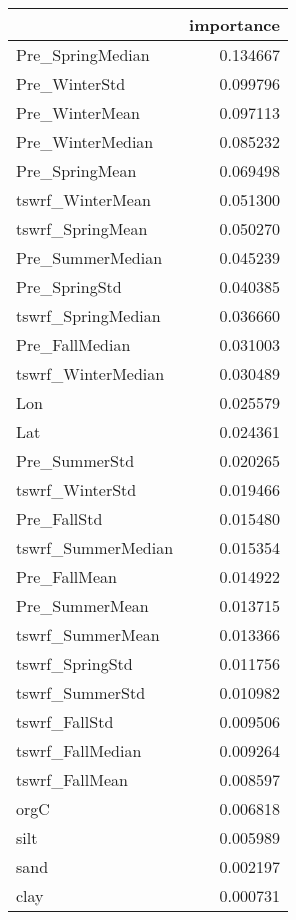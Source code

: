 \begin{tabular}{lr}
\toprule
 & importance \\
\midrule
Pre_SpringMedian & 0.134667 \\
Pre_WinterStd & 0.099796 \\
Pre_WinterMean & 0.097113 \\
Pre_WinterMedian & 0.085232 \\
Pre_SpringMean & 0.069498 \\
tswrf_WinterMean & 0.051300 \\
tswrf_SpringMean & 0.050270 \\
Pre_SummerMedian & 0.045239 \\
Pre_SpringStd & 0.040385 \\
tswrf_SpringMedian & 0.036660 \\
Pre_FallMedian & 0.031003 \\
tswrf_WinterMedian & 0.030489 \\
Lon & 0.025579 \\
Lat & 0.024361 \\
Pre_SummerStd & 0.020265 \\
tswrf_WinterStd & 0.019466 \\
Pre_FallStd & 0.015480 \\
tswrf_SummerMedian & 0.015354 \\
Pre_FallMean & 0.014922 \\
Pre_SummerMean & 0.013715 \\
tswrf_SummerMean & 0.013366 \\
tswrf_SpringStd & 0.011756 \\
tswrf_SummerStd & 0.010982 \\
tswrf_FallStd & 0.009506 \\
tswrf_FallMedian & 0.009264 \\
tswrf_FallMean & 0.008597 \\
orgC & 0.006818 \\
silt & 0.005989 \\
sand & 0.002197 \\
clay & 0.000731 \\
\bottomrule
\end{tabular}

